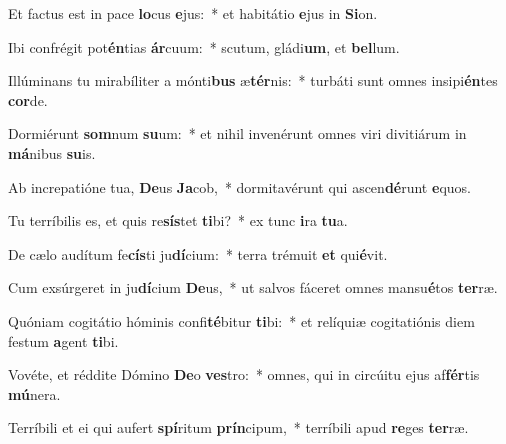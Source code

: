 \item Et factus est in pace \textbf{lo}cus \textbf{e}jus:~* et habitátio \textbf{e}jus in \textbf{Si}on.
\item Ibi confrégit pot\textbf{én}tias \textbf{ár}cuum:~* scutum, gládi\textbf{um}, et \textbf{bel}lum.
\item Illúminans tu mirabíliter a mónti\textbf{bus} æ\textbf{tér}nis:~* turbáti sunt omnes insipi\textbf{én}tes \textbf{cor}de.
\item Dormiérunt \textbf{som}num \textbf{su}um:~* et nihil invenérunt omnes viri divitiárum in \textbf{má}nibus \textbf{su}is.
\item Ab increpatióne tua, \textbf{De}us \textbf{Ja}cob,~* dormitavérunt qui ascen\textbf{dé}runt \textbf{e}quos.
\item Tu terríbilis es, et quis re\textbf{sís}tet \textbf{ti}bi?~* ex tunc \textbf{i}ra \textbf{tu}a.
\item De cælo audítum fe\textbf{cís}ti ju\textbf{dí}cium:~* terra trémuit \textbf{et} qui\textbf{é}vit.
\item Cum exsúrgeret in ju\textbf{dí}cium \textbf{De}us,~* ut salvos fáceret omnes mansu\textbf{é}tos \textbf{ter}ræ.
\item Quóniam cogitátio hóminis confi\textbf{té}bitur \textbf{ti}bi:~* et relíquiæ cogitatiónis diem festum \textbf{a}gent \textbf{ti}bi.
\item Vovéte, et réddite Dómino \textbf{De}o \textbf{ves}tro:~* omnes, qui in circúitu ejus af\textbf{fér}tis \textbf{mú}nera.
\item Terríbili et ei qui aufert \textbf{spí}ritum \textbf{prín}cipum,~* terríbili apud \textbf{re}ges \textbf{ter}ræ.
